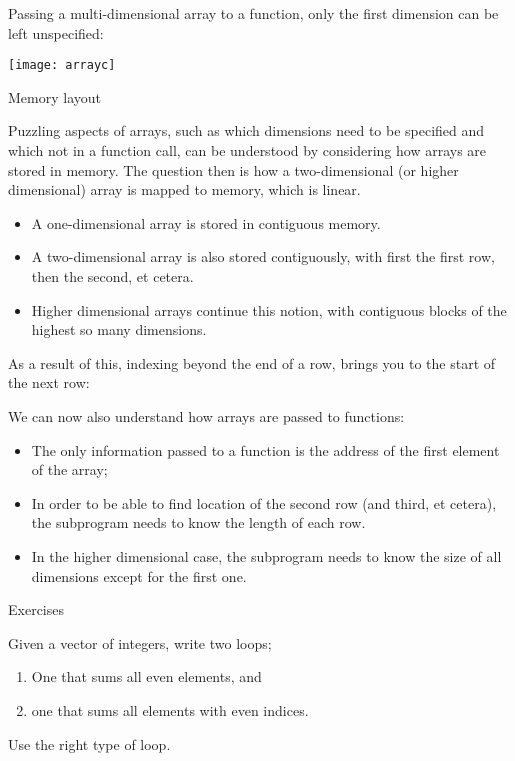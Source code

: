 Passing a multi-dimensional array to a function, only the first
dimension can be left unspecified:
%

\texttt{[image: arrayc]}

 {Memory layout}

Puzzling aspects of arrays, such as which dimensions need to be
specified and which not in a function call, can be understood by
considering how arrays are stored in memory.
The question then is how a two-dimensional (or higher dimensional)
array is mapped to memory, which is linear.
\begin{itemize}
\item A one-dimensional array is stored in contiguous memory.
\item A two-dimensional array is also stored contiguously, with first
  the first row, then the second, et cetera.
\item Higher dimensional arrays continue this notion, with contiguous
  blocks of the highest so many dimensions.
\end{itemize}

As a result of this, indexing beyond the end of a row, brings you to the
start of the next row:
%

We can now also understand how arrays are passed to functions:
\begin{itemize}
\item The only information passed to a function is the address of the
  first element of the array;
\item In order to be able to find location of the second row (and
  third, et cetera), the subprogram needs to know the length of each
  row.
\item In the higher dimensional case, the subprogram needs to know the
  size of all dimensions except for the first one.
\end{itemize}

 {Exercises}

\begin{exercise}
  Given a vector of integers, write two loops;
  \begin{enumerate}
  \item One that sums all even elements, and
  \item one that sums all elements with even indices.
  \end{enumerate}
  Use the right type of loop.
\end{exercise}

